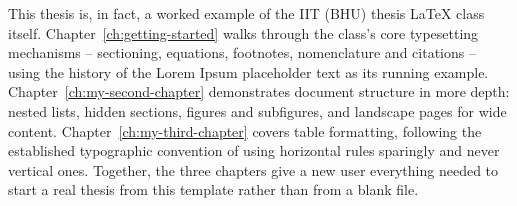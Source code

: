This thesis is, in fact, a worked example of the IIT (BHU) thesis \LaTeX{}
class itself. Chapter~\ref{ch:getting-started} walks through the class's
core typesetting mechanisms -- sectioning, equations, footnotes,
nomenclature and citations -- using the history of the Lorem Ipsum
placeholder text as its running example. Chapter~\ref{ch:my-second-chapter}
demonstrates document structure in more depth: nested lists, hidden
sections, figures and subfigures, and landscape pages for wide content.
Chapter~\ref{ch:my-third-chapter} covers table formatting, following the
established typographic convention of using horizontal rules sparingly
and never vertical ones. Together, the three chapters give a new user
everything needed to start a real thesis from this template rather than
from a blank file.
